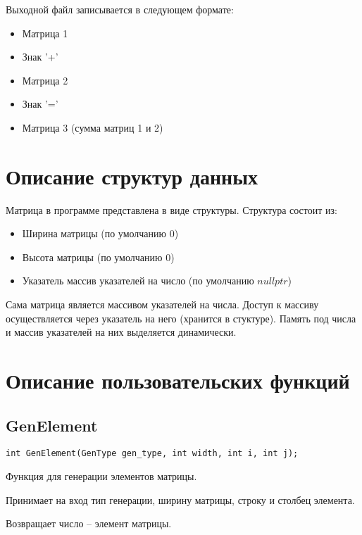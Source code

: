 \documentclass[12pt,a4paper]{article}  %
\begin{document}
	Выходной файл записывается в следующем формате:
	
	\begin{itemize}
		\item Матрица 1
		\item Знак '+'
		\item Матрица 2
		\item Знак '='
		\item Матрица 3 (сумма матриц 1 и 2)
	\end{itemize}
	
	\section*{Описание структур данных}
	
	Матрица в программе представлена в виде структуры.
	Структура состоит из:
	
	\begin{itemize}
		\item Ширина матрицы (по умолчанию 0)
		\item Высота матрицы (по умолчанию 0)
		\item Указатель массив указателей на число (по умолчанию $ nullptr $)
	\end{itemize}

	Сама матрица является массивом указателей на числа. 
	Доступ к массиву осуществляется через указатель на него (хранится в стуктуре). 
	Память под числа и массив указателей на них выделяется динамически. 
	
	\section*{Описание пользовательских функций}

	\subsection*{GenElement}

	\begin{lstlisting}[label={lst:GenElement}]
		int GenElement(GenType gen_type, int width, int i, int j);
	\end{lstlisting}

	Функция для генерации элементов матрицы.

	Принимает на вход тип генерации, ширину матрицы,
	строку и столбец элемента.

	Возвращает число -- элемент матрицы.
\end{document}
